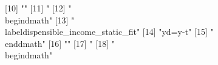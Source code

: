 [10] ""                                                                                                                                                                                                                                                                                              
[11] "%
[12] "\\begin{dmath}"                                                                                                                                                                                                                                                                                
[13] "\\label{dispensible_income_static_fit}"                                                                                                                                                                                                                                                        
[14] "{yd}={y}-{t}"                                                                                                                                                                                                                                                                                  
[15] "\\end{dmath}"                                                                                                                                                                                                                                                                                  
[16] ""                                                                                                                                                                                                                                                                                              
[17] "%
[18] "\\begin{dmath}"                                                                                                                                                                                                                                                                                
